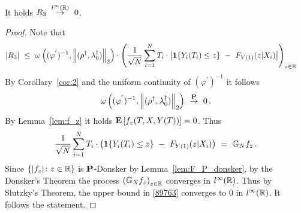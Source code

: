   
\begin{lemma}
  It holds
  $
    R_3
    \ 
    \overset{l^\infty(\R)}{\to}
    \ 
    0
  $.
\end{lemma}
\begin{proof}
Note that
\begin{align}
  \label{89763}
  \left| 
  R_3
  \right|
  &
  \
  \le
  \ 
  \omega
  \left( 
    (\varphi^{'})^{-1}
    ,
    \norm{(\rho^\dagger,\lambda_0^\dagger)}_2
  \right)
  \cdot
  \left( 
  \frac{1}{
  \sqrt{N}
  }
    \sum_{i=1}^{N} 
    T_i
    \cdot
    \left|
    \mathbf{1}{\left\{ Y_i(T_i) \le z \right\}}
    \ 
    -
    \ 
  F_{Y(1)}(z|X_i)
    \right|
\right)_{z\in\R}
    \,
\end{align}
By Corollary~\ref{cor:2} and the uniform continuity of 
$
    (\varphi^{'})^{-1}
$ it follows 
\begin{align*}
  \omega
  \left( 
    (\varphi^{'})^{-1}
    ,
    \norm{(\rho^\dagger,\lambda_0^\dagger)}_2
  \right)
  \ 
  \overset{\P}{\to}
  \ 
  0
  \,.
\end{align*}
By Lemma~\ref{lem:f_z}
it holds 
$
\E \left[ f_z(T,X,Y(T)) \right]=0
$.
Thus
\begin{align*}
  \frac{1}{\sqrt{N}}
    \sum_{i=1}^{N} 
    T_i
    \cdot
    \left( 
    \mathbf{1}{\left\{ Y_i(T_i) \le z \right\}}
    \ 
    -
    \ 
  F_{Y(1)}(z|X_i)
    \right)
    \ 
    =
    \ 
    \G_N f_z
    \,.
\end{align*}
Since $\left\{
  |f_z|\colon z\in\R
\right\}$ is $\P$-Donsker by Lemma~\ref{lem:F_P_donsker}, by the Donsker's Theorem
the process 
$
\left( 
\G_N f_z
\right)_{z\in\R}
$
converges in $l^\infty(\R)$.
Thus by Slutzky's Theorem, the upper bound in \eqref{89763} converges to 0 in $l^\infty(\R)$.
It follows the statement.
\end{proof}
